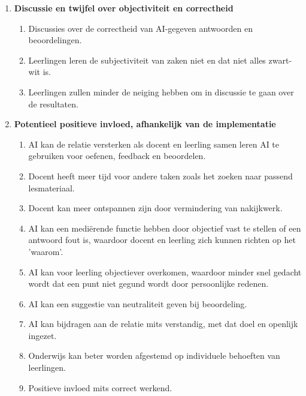\documentclass[12pt]{article}
\begin{document}
\begin{enumerate}
\item \textbf{Discussie en twijfel over objectiviteit en correctheid}
    \begin{enumerate}
        \item   Discussies over de correctheid van AI-gegeven antwoorden en beoordelingen.
        \item   Leerlingen leren de subjectiviteit van zaken niet en dat niet alles zwart-wit is.
        \item Leerlingen zullen minder de neiging hebben om in discussie te gaan over de resultaten.
    \end{enumerate}

\item   \textbf{Potentieel positieve invloed, afhankelijk van de implementatie}
    \begin{enumerate}
        \item   AI kan de relatie versterken als docent en leerling samen leren AI te gebruiken voor oefenen, feedback en beoordelen.
        \item   Docent heeft meer tijd voor andere taken zoals het zoeken naar passend lesmateriaal.
        \item   Docent kan meer ontspannen zijn door vermindering van nakijkwerk.
        \item   AI kan een mediërende functie hebben door objectief vast te stellen of een antwoord fout is, waardoor docent en leerling zich kunnen richten op het 'waarom'.
        \item  AI kan voor leerling objectiever overkomen, waardoor minder snel gedacht wordt dat een punt niet gegund wordt door persoonlijke redenen.
        \item AI kan een suggestie van neutraliteit geven bij beoordeling.
        \item   AI kan bijdragen aan de relatie mits verstandig, met dat doel en openlijk ingezet.
        \item   Onderwijs kan beter worden afgestemd op individuele behoeften van leerlingen.
        \item Positieve invloed mits correct werkend.
    \end{enumerate}


\end{enumerate}
\end{document}

